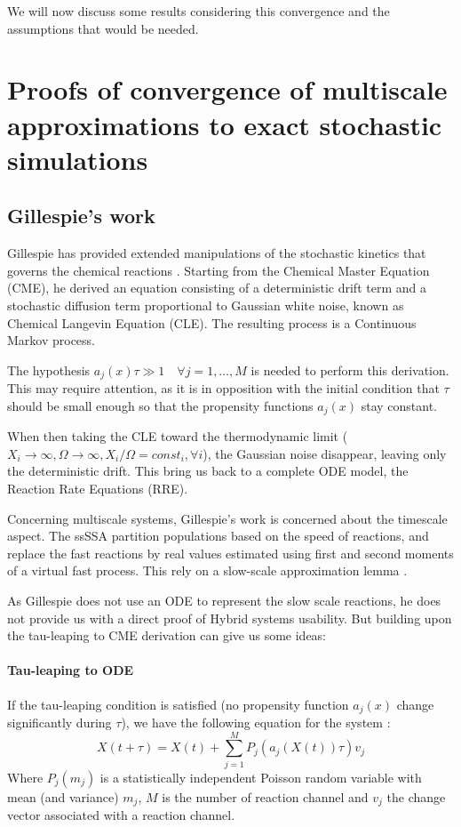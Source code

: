 \documentclass[letterpaper, oneside]{article}
\begin{document}
We will now discuss some results considering this convergence and the assumptions that would be needed.

\section{Proofs of convergence of multiscale approximations to exact stochastic simulations} %
\label{sec:proofs_of_convergence_of_multiscale_approximations_to_exact_stochastic_simulations}

\subsection{Gillespie's work} %
\label{sub:gillespie_s_work}
Gillespie has provided extended manipulations of the stochastic kinetics that governs the chemical reactions \cite{Gillespie:2007p1788}. Starting from the Chemical Master Equation (CME), he derived an equation consisting of a deterministic drift term and a stochastic diffusion term proportional to Gaussian white noise, known as Chemical Langevin Equation (CLE). The resulting process is a Continuous Markov process.

The hypothesis $a_j(x) \tau \gg 1 \quad \forall j=1,\dots, M$ is needed to perform this derivation. This may require attention, as it is in opposition with the initial condition that $\tau$ should be small enough so that the propensity functions $a_j(x)$ stay constant.

When then taking the CLE toward the thermodynamic limit ($X_i \rightarrow \infty, \Omega \rightarrow \infty, X_i/\Omega = const_i, \forall i$), the Gaussian noise disappear, leaving only the deterministic drift. This bring us back to a complete ODE model, the Reaction Rate Equations (RRE).

Concerning multiscale systems, Gillespie's work is concerned about the timescale aspect. The ssSSA partition populations based on the speed of reactions, and replace the fast reactions by real values estimated using first and second moments of a virtual fast process. This rely on a slow-scale approximation lemma \cite{Cao:2005p5664}\cite{Gillespie:2007p5659}.

As Gillespie does not use an ODE to represent the slow scale reactions, he does not provide us with a direct proof of Hybrid systems usability. But building upon the tau-leaping to CME derivation can give us some ideas:

\paragraph{Tau-leaping to ODE} %
\label{par:tau_leaping_to_ode}
If the tau-leaping condition is satisfied (no propensity function $a_j(x)$ change significantly during $\tau$), we have the following equation for the system \cite{Gillespie:2007p1788}:
\[
X(t+ \tau) = X(t) + \sum_{j=1}^M P_j(a_j(X(t))\tau) v_j	
\]
Where $P_j(m_j)$ is a statistically independent Poisson random variable with mean (and variance) $m_j$, $M$ is the number of reaction channel and $v_j$ the change vector associated with a reaction channel.
\end{document}
